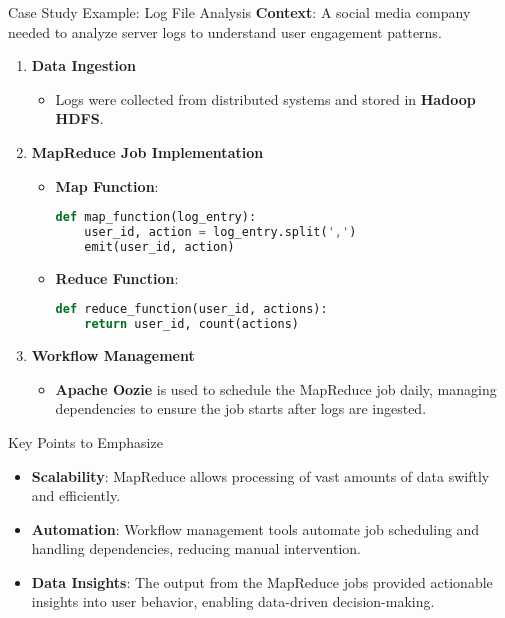 \documentclass[aspectratio=169]{beamer}
\begin{document}
\begin{frame}{Case Study Example: Log File Analysis}
    \textbf{Context}: A social media company needed to analyze server logs to understand user engagement patterns.
    
    \begin{enumerate}
        \item \textbf{Data Ingestion}
        \begin{itemize}
            \item Logs were collected from distributed systems and stored in \textbf{Hadoop HDFS}.
        \end{itemize}

        \item \textbf{MapReduce Job Implementation}
        \begin{itemize}
            \item \textbf{Map Function}:
            \begin{lstlisting}[language=Python]
def map_function(log_entry):
    user_id, action = log_entry.split(',')
    emit(user_id, action)
            \end{lstlisting}
        
            \item \textbf{Reduce Function}:
            \begin{lstlisting}[language=Python]
def reduce_function(user_id, actions):
    return user_id, count(actions)
            \end{lstlisting}
        \end{itemize}

        \item \textbf{Workflow Management}
        \begin{itemize}
            \item \textbf{Apache Oozie} is used to schedule the MapReduce job daily, managing dependencies to ensure the job starts after logs are ingested.
        \end{itemize}
    \end{enumerate}
\end{frame}

\begin{frame}{Key Points to Emphasize}
    \begin{itemize}
        \item \textbf{Scalability}: 
        MapReduce allows processing of vast amounts of data swiftly and efficiently.
        
        \item \textbf{Automation}: 
        Workflow management tools automate job scheduling and handling dependencies, reducing manual intervention.
        
        \item \textbf{Data Insights}: 
        The output from the MapReduce jobs provided actionable insights into user behavior, enabling data-driven decision-making.
    \end{itemize}
\end{frame}
\end{document}
